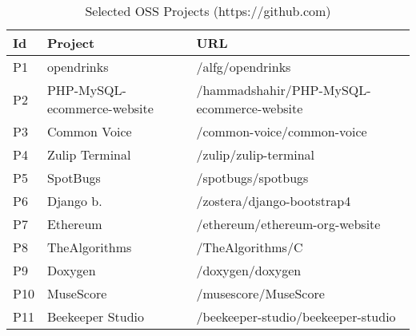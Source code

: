 \begin{table}[ht]
    \centering
    \caption{Selected OSS Projects (https://github.com)}
    \label{tab:oss_projects}
    \begin{tabular}{l|p{2cm}|p{3.75cm}}
\hline
Id  & Project  & URL 
\\ \hline
P1 & opendrinks & /alfg/opendrinks
\\
P2 & PHP-MySQL-ecommerce-website & /hammadshahir/PHP-MySQL-ecommerce-website
\\
P3 & Common Voice & /common-voice/common-voice
\\
P4 & Zulip Terminal & /zulip/zulip-terminal
\\
P5 & SpotBugs & /spotbugs/spotbugs
\\
P6 & Django b. & /zostera/django-bootstrap4
\\
P7 & Ethereum & /ethereum/ethereum-org-website
\\
P8 & TheAlgorithms & /TheAlgorithms/C
\\
P9 & Doxygen & /doxygen/doxygen
\\
P10 & MuseScore & /musescore/MuseScore
\\ 
P11 & Beekeeper Studio & /beekeeper-studio/beekeeper-studio
\\
\hline
    \end{tabular}
\end{table}

